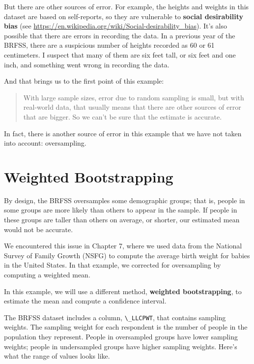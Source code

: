 But there are other sources of error. For example, the heights and
weights in this dataset are based on self-reports, so they are
vulnerable to \textbf{social desirability bias} (see
\url{https://en.wikipedia.org/wiki/Social-desirability_bias}). It's also
possible that there are errors in recording the data. In a previous year
of the BRFSS, there are a suspicious number of heights recorded as 60 or
61 centimeters. I suspect that many of them are six feet tall, or six
feet and one inch, and something went wrong in recording the data.

And that brings us to the first point of this example:

\begin{quote}
With large sample sizes, error due to random sampling is small, but with
real-world data, that usually means that there are other sources of
error that are bigger. So we can't be sure that the estimate is
accurate.
\end{quote}

In fact, there is another source of error in this example that we have
not taken into account: oversampling.

\hypertarget{weighted-bootstrapping}{%
\section{Weighted Bootstrapping}\label{weighted-bootstrapping}}

By design, the BRFSS oversamples some demographic groups; that is,
people in some groups are more likely than others to appear in the
sample. If people in these groups are taller than others on average, or
shorter, our estimated mean would not be accurate.

We encountered this issue in Chapter 7, where we used data from the
National Survey of Family Growth (NSFG) to compute the average birth
weight for babies in the United States. In that example, we corrected
for oversampling by computing a weighted mean.

In this example, we will use a different method, \textbf{weighted
bootstrapping}, to estimate the mean and compute a confidence interval.

The BRFSS dataset includes a column, \passthrough{\lstinline!\_LLCPWT!},
that contains sampling weights. The sampling weight for each respondent
is the number of people in the population they represent. People in
oversampled groups have lower sampling weights; people in undersampled
groups have higher sampling weights. Here's what the range of values
looks like.

